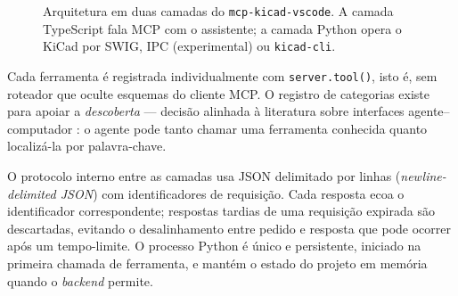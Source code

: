 \begin{figure}[htbp]
\centering
{}
\caption{Arquitetura em duas camadas do \texttt{mcp-kicad-vscode}. A camada
TypeScript fala MCP com o assistente; a camada Python opera o KiCad por SWIG,
IPC (experimental) ou \texttt{kicad-cli}.}
\label{fig:arquitetura}
\end{figure}

Cada ferramenta é registrada individualmente com \texttt{server.tool()}, isto é,
sem roteador que oculte esquemas do cliente MCP. O registro de categorias
existe para apoiar a \emph{descoberta} --- decisão alinhada à literatura sobre
interfaces agente--computador \citep{yang2024sweagent}: o agente pode tanto
chamar uma ferramenta conhecida quanto localizá-la por palavra-chave.

O protocolo interno entre as camadas usa JSON delimitado por linhas
(\emph{newline-delimited JSON}) com identificadores de requisição. Cada
resposta ecoa o identificador correspondente; respostas tardias de uma
requisição expirada são descartadas, evitando o desalinhamento entre pedido e
resposta que pode ocorrer após um tempo-limite. O processo Python é único e
persistente, iniciado na primeira chamada de ferramenta, e mantém o estado do
projeto em memória quando o \emph{backend} permite.

